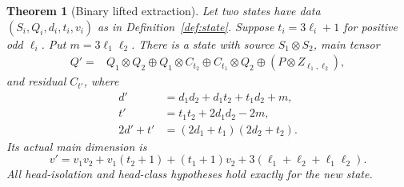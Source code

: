 \documentclass[11pt]{article}
\newtheorem{theorem}{Theorem}[section]
\theoremstyle{definition}\newtheorem{definition}[theorem]{Definition}
\theoremstyle{remark}\newtheorem{remark}[theorem]{Remark}
\begin{document}
\begin{theorem}[Binary lifted extraction]\label{thm:mixed}
Let two states have data $(S_i,Q_i,d_i,t_i,v_i)$ as in Definition~\ref{def:state}. Suppose $t_i=3\ell_i+1$ for positive odd $\ell_i$. Put $m=3\ell_1\ell_2$. There is a state with source $S_1\otimes S_2$, main tensor
\begin{align}\label{eq:Qprime}
 Q'={}&Q_1\otimes Q_2
 \oplus Q_1\otimes C_{t_2}
 \oplus C_{t_1}\otimes Q_2
 \oplus(P\otimes Z_{\ell_1,\ell_2}),
\end{align}
and residual $C_{t'}$, where
\begin{align}
 d'&=d_1d_2+d_1t_2+t_1d_2+m,\label{eq:mixed-d}\\
 t'&=t_1t_2+2d_1d_2-2m,\label{eq:mixed-t}\\
 2d'+t'&=(2d_1+t_1)(2d_2+t_2).\label{eq:mixed-D}
\end{align}
Its actual main dimension is
\begin{equation}\label{eq:mixed-v}
 v'=v_1v_2+v_1(t_2+1)+(t_1+1)v_2+3(\ell_1+\ell_2+\ell_1\ell_2).
\end{equation}
All head-isolation and head-class hypotheses hold exactly for the new state.
\end{theorem}
\end{document}
